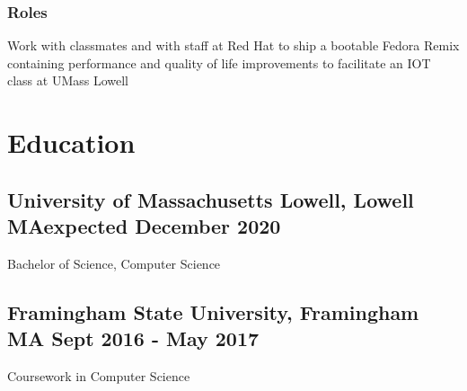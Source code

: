 \documentclass[11pt]{article}
\begin{document}
\subsubsection{Roles}Work with classmates
and with staff at Red Hat
to ship a bootable Fedora Remix containing performance and quality of life improvements
to facilitate an IOT class at UMass Lowell

\section{Education}

\subsection{University of Massachusetts Lowell, Lowell MA\dotfill expected December 2020}
{\hspace{-1em} Bachelor of Science, Computer Science}

\subsection{Framingham State University, Framingham MA
\dotfill Sept 2016 - May 2017} 
{\hspace{-1em} Coursework in Computer Science}
\end{document}
